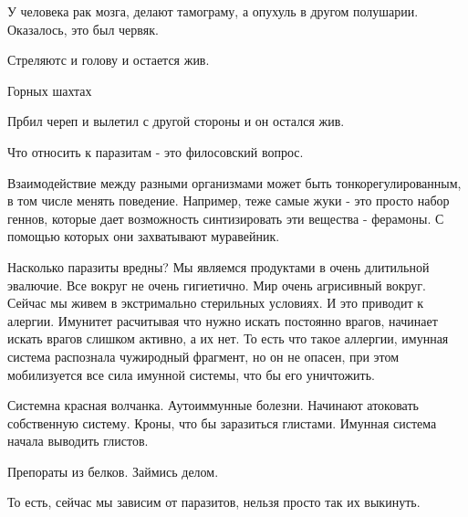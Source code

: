 У человека рак мозга,
делают тамограму, а опухуль в
другом полушарии. Оказалось,
это был червяк.

Стреляютс и голову и остается жив. 

Горных шахтах

Прбил череп и вылетил с другой стороны и
он остался жив.

Что относить к паразитам - это
филосовский вопрос.

Взаимодействие между разными организмами
может быть тонкорегулированным,
в том числе менять поведение. Например,
теже самые жуки - это
просто набор геннов, которые дает возможность
синтизировать эти вещества - ферамоны. С помощью
которых они захватывают муравейник.


Насколько паразиты вредны? Мы
являемся продуктами в очень длитильной эвалючие.
Все вокруг не очень гигиетично. Мир очень агрисивный вокруг.
Сейчас мы живем в экстримально стерильных условиях.
И это приводит к алергии. Имунитет расчитывая
что нужно искать постоянно врагов,
начинает искать врагов слишком активно,
а их нет. То есть что такое аллергии,
имунная система распознала чужиродный фрагмент, но он
не опасен, при этом мобилизуется все сила имунной системы, что
бы его уничтожить.

Системна красная волчанка. Аутоиммунные болезни. Начинают
атоковать собственную систему. Кроны, что бы
заразиться глистами. Имунная система начала выводить
глистов.

Препораты из белков. Займись делом.

То есть, сейчас мы зависим от паразитов, нельзя
просто так их выкинуть.